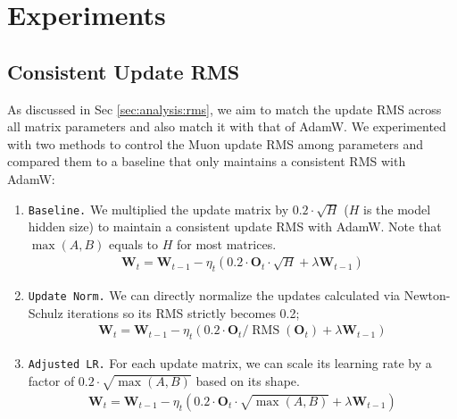 \section{Experiments}

\subsection{Consistent Update RMS}
\label{sec:exp:rms}

As discussed in Sec \ref{sec:analysis:rms}, we aim to match the update RMS across all matrix parameters and also match it with that of AdamW. We experimented with two methods to control the Muon update RMS among parameters and compared them to a baseline that only maintains a consistent RMS with AdamW:

\begin{enumerate}
    \item \texttt{Baseline.} We multiplied the update matrix by $0.2\cdot \sqrt{H}$ ($H$ is the model hidden size) to maintain a consistent update RMS with AdamW. Note that $\max(A,B)$ equals to $H$ for most matrices.
    \begin{align}
    \mathbf{W}_t = \mathbf{W}_{t-1} - \eta_t (0.2\cdot\mathbf{O}_t\cdot\sqrt{H} + \lambda \mathbf{W}_{t-1})
    \end{align}
    \item \texttt{Update Norm.} We can directly normalize the updates calculated via Newton-Schulz iterations so its RMS strictly becomes 0.2;
    \begin{align}
    \mathbf{W}_t = \mathbf{W}_{t-1} - \eta_t (0.2\cdot\mathbf{O}_t/\mathop{\text{RMS}}(\mathbf{O}_t) + \lambda \mathbf{W}_{t-1})
    \end{align}
    \item \texttt{Adjusted LR.} For each update matrix, we can scale its learning rate by a factor of $0.2 \cdot \sqrt{\max(A, B)}$ based on its shape. 
    \begin{align}
    \mathbf{W}_t = \mathbf{W}_{t-1} - \eta_t (0.2\cdot\mathbf{O}_t\cdot\sqrt{\max(A,B)} + \lambda \mathbf{W}_{t-1})
    \end{align}
\end{enumerate}


